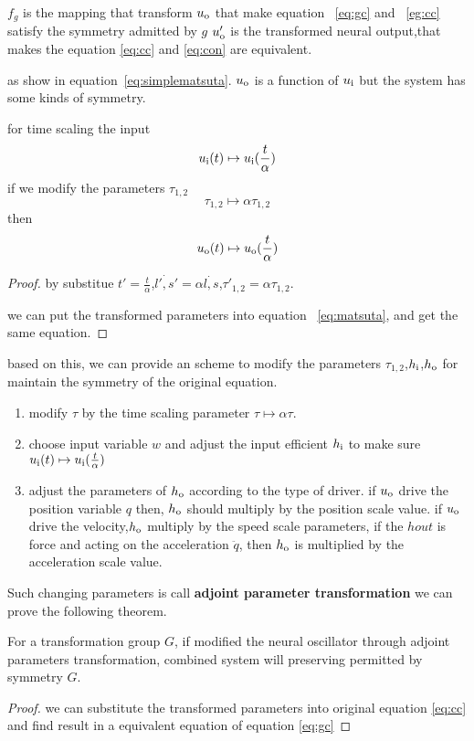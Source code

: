 $f_g$ is the mapping that transform $u_{\mathrm{o}}$ that make equation ~\ref{eq:gc} and ~\ref{eg:cc} satisfy the symmetry admitted by $g$
$u_{\mathrm{o}}'$ is the transformed neural output,that makes the equation \ref{eq:cc} and \ref{eq:con} are equivalent.
 

as show in equation~\ref{eq:simplematsuta}.
$u_{\mathrm{o}}$ is a function of $u_{\mathrm{i}}$
but the system has some kinds of symmetry.
\begin{mythe}
for time scaling the input
\[
u_{\mathrm{i}}(t) \mapsto u_{\mathrm{i}}(\frac{t}{\alpha})
\]
if we modify the parameters $\tau_{1,2}$
\[
\tau_{1,2} \mapsto \alpha \tau_{1,2}
\]
then
\[
u_{\mathrm{o}}(t) \mapsto u_{\mathrm{o}}(\frac{t}{\alpha})
\]
\end{mythe}
\begin{proof}

by substitue $t'=\frac{t}{\alpha}$,$\dot{l',s'}=\alpha \dot{l,s}$,$\tau'_{1,2}=\alpha \tau_{1,2}$.


we can put the transformed parameters into equation~ \ref{eq:matsuta}, and get the same equation.

\end{proof}

based on this, we can provide an scheme to modify the parameters $\tau_{1,2}$,$h_{\mathrm{i}}$,$h_{\mathrm{o}}$ for maintain the symmetry of the original equation.
\begin{enumerate}
\item modify $\tau$ by the time scaling parameter $\tau \mapsto \alpha \tau$.
\item choose input variable $w$ and adjust the input efficient $h_{\mathrm{i}}$ to make sure $u_{\mathrm{i}}(t) \mapsto u_{\mathrm{i}}(\frac{t}{\alpha})$
\item adjust the parameters of $h_{\mathrm{o}}$ according to the type of driver. if $u_{\mathrm{o}}$ drive the position variable $q$ then, $h_{\mathrm{o}}$ should multiply by the position scale value. if $u_{\mathrm{o}}$ drive the velocity,$h_{\mathrm{o}}$ multiply by the speed scale parameters, if the $hout$ is force and acting on the acceleration $\ddot{q}$, then $h_{\mathrm{o}}$ is multiplied by the acceleration scale value.
\end{enumerate}
Such changing parameters is call \textbf{adjoint parameter transformation} we can prove the following theorem.
\begin{mythe}
For a transformation group $G$, if modified the neural oscillator through adjoint parameters transformation, combined system will preserving permitted by symmetry $G$.
\end{mythe}
\begin{proof}
we can substitute the transformed parameters into original equation \ref{eq:cc} and find result in a equivalent equation of equation \ref{eq:gc}
\end{proof}

